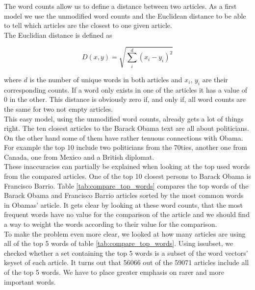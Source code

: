 \documentclass[12pt]{scrreprt}
\begin{document}
The word counts allow us to define a distance between two articles. As a first model we use the unmodified word counts and the Euclidean distance to be able to tell which articles are the closest to one given article.\\

\noindent
The Euclidian distance is defined as
\begin{center}
\begin{equation}
\label{eq:eu}
D(x, y) = \sqrt{ \sum^d_i (x_i - y_i)^2 }
\end{equation}
\end{center}  
where $d$ is the number of unique words in both articles and $x_i$, $y_i$ are their corresponding counts. If a word only exists in one of the articles it has a value of $0$ in the other. This distance is obviously zero if, and only if, all word counts are the same for two not empty articles.\\

This easy model, using the unmodified word counts, already gets a lot of things right. The ten closest articles to the Barack Obama text are all about politicians. On the other hand some of them have rather tenuous connections with Obama. For example the top 10 include two politicians from the 70ties, another one from Canada, one from Mexico and a British diplomat.\\

These inaccuracies can partially be explained when looking at the top used words from the compared articles. One of the top 10 closest persons to Barack Obama is Francisco Barrio. Table \ref{tab:compare_top_words} compares the top words of the Barack Obama and Francisco Barrio articles sorted by the most common words in Obamas' article. It gets clear by looking at these word counts, that the most frequent words have no value for the comparison of the article and we should find a way to weight the words according to their value for the comparison.\\

To make the problem even more clear, we looked at how many articles are using all of the top 5 words of table \ref{tab:compare_top_words}. Using issubset, we checked whether a set containing the top 5 words is a subset of the word vectors' keyset of each article. It turns out that 56066 out of the 59071 articles include all of the top 5 words. We have to place greater emphasis on rarer and more important words.\\
\end{document}
